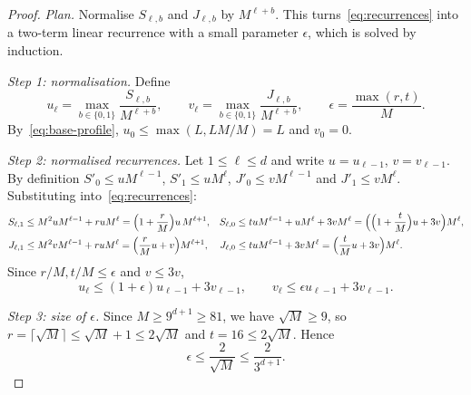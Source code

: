 \documentclass[11pt]{article}
\theoremstyle{definition}
\theoremstyle{remark}
\begin{document}
\begin{proof}
\emph{Plan.} Normalise $S_{\ell,b}$ and $J_{\ell,b}$ by $M^{\ell+b}$. This
turns~\eqref{eq:recurrences} into a two-term linear recurrence with a small
parameter $\epsilon$, which is solved by induction.

\emph{Step 1: normalisation.} Define
\[
 u_\ell=\max_{b\in\{0,1\}}\frac{S_{\ell,b}}{M^{\ell+b}},
 \qquad
 v_\ell=\max_{b\in\{0,1\}}\frac{J_{\ell,b}}{M^{\ell+b}},
 \qquad
 \epsilon=\frac{\max(r,t)}{M}.
\]
By~\eqref{eq:base-profile}, $u_0\le\max(L,LM/M)=L$ and $v_0=0$.

\emph{Step 2: normalised recurrences.} Let $1\le\ell\le d$ and write
$u=u_{\ell-1}$, $v=v_{\ell-1}$. By definition $S'_0\le uM^{\ell-1}$,
$S'_1\le uM^\ell$, $J'_0\le vM^{\ell-1}$ and $J'_1\le vM^\ell$. Substituting
into~\eqref{eq:recurrences}:
\begin{align*}
 S_{\ell,1}&\le M^2uM^{\ell-1}+ruM^\ell
   =\Bigl(1+\frac rM\Bigr)u\,M^{\ell+1},
 &S_{\ell,0}&\le tuM^{\ell-1}+uM^\ell+3vM^\ell
   =\Bigl(\Bigl(1+\frac tM\Bigr)u+3v\Bigr)M^\ell,\\
 J_{\ell,1}&\le M^2vM^{\ell-1}+ruM^\ell
   =\Bigl(\frac rMu+v\Bigr)M^{\ell+1},
 &J_{\ell,0}&\le tuM^{\ell-1}+3vM^\ell
   =\Bigl(\frac tMu+3v\Bigr)M^\ell.
\end{align*}
Since $r/M,t/M\le\epsilon$ and $v\le3v$,
\begin{equation}
\label{eq:normalized-recurrences}
  u_\ell\leq (1+\epsilon)u_{\ell-1}+3v_{\ell-1},\qquad
  v_\ell\leq \epsilon u_{\ell-1}+3v_{\ell-1}.
\end{equation}

\emph{Step 3: size of $\epsilon$.} Since $M\ge9^{d+1}\ge81$, we have
$\sqrt M\ge9$, so $r=\lceil\sqrt M\rceil\le\sqrt M+1\le2\sqrt M$ and
$t=16\le2\sqrt M$. Hence
\begin{equation}
\label{eq:epsilon-choice}
 \epsilon\leq\frac{2}{\sqrt M}\leq\frac{2}{3^{d+1}}.
\end{equation}


\end{proof}
\end{document}
